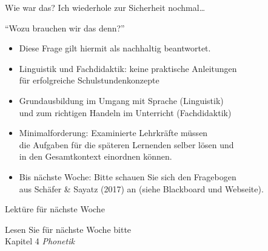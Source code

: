 \begin{frame}
  {Wie war das?}
  Ich wiederhole zur Sicherheit nochmal\ldots\\
  \vspace{\baselineskip}
  \pause
  \begin{center}
    \Large{}
  \end{center}
\end{frame}

\begin{frame}
  {"`Wozu brauchen wir das denn?"'}
  \pause
  \begin{itemize}[<+->]
    \item Diese Frage gilt hiermit als nachhaltig beantwortet.
    \item Linguistik und Fachdidaktik: keine praktische Anleitungen\\
      für erfolgreiche Schulstundenkonzepte
    \item Grundausbildung im \alert{Umgang mit Sprache} (Linguistik)\\
      und zum \alert{richtigen Handeln im Unterricht} (Fachdidaktik)
      \vspace{\baselineskip}
    \item Minimalforderung: \alert{Examinierte Lehrkräfte müssen\\
      die Aufgaben für die späteren Lernenden selber lösen und\\
      in den Gesamtkontext einordnen können.}
    \item \alert{Bis nächste Woche: Bitte schauen Sie sich den Fragebogen\\
      aus Schäfer \& Sayatz (2017) an (siehe Blackboard und Webseite).}
  \end{itemize}
\end{frame}

\begin{frame}
  {Lektüre für nächste Woche}

  \begin{center}
    \Large
    \alert{Lesen Sie für nächste Woche bitte}\\
    \alert{Kapitel 4 \textit{Phonetik}}
  \end{center}

  \pause
  \pause
  \pause
  \pause
  \pause
\end{frame}
